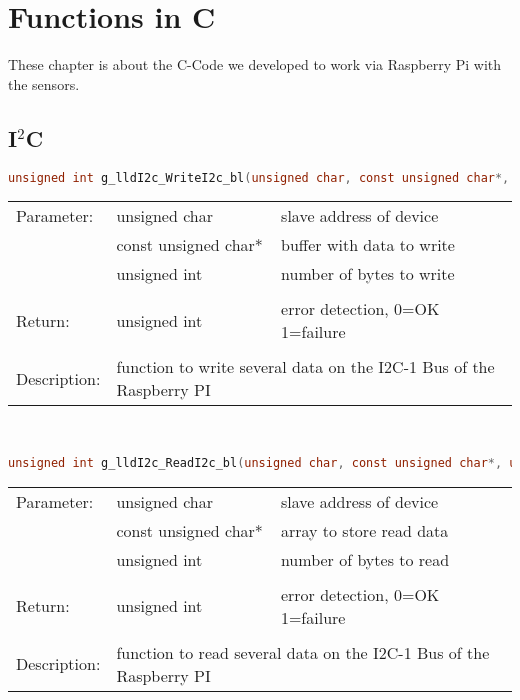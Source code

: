 
\chapter{Functions in C}
\label{ch:functions}

These chapter is about the C-Code we developed to work via Raspberry Pi with the sensors.


\section{I$^2$C}

\begin{lstlisting}[language=C, basicstyle=\small, caption=Write on I2C-1]
unsigned int g_lldI2c_WriteI2c_bl(unsigned char, const unsigned char*, unsigned int);
\end{lstlisting}


\begin{tabular}{lll}
Parameter: & unsigned char & slave address of device\\
					 & const unsigned char* & buffer with data to write\\
					 & unsigned int & number of bytes to write\\
					 &	\\
Return: & unsigned int & error detection, 0=OK 1=failure\\
							&&\\
Description: & \multicolumn{2}{l}{function to write several data on the I2C-1 Bus of the Raspberry PI}\\
\end{tabular}
\\


\begin{lstlisting}[language=C, basicstyle=\small, caption=Read from I2C-1]
unsigned int g_lldI2c_ReadI2c_bl(unsigned char, const unsigned char*, unsigned int);
\end{lstlisting}

\begin{tabular}{lll}
Parameter: & unsigned char & slave address of device\\
					 & const unsigned char* & array to store read data\\
					 & unsigned int & number of bytes to read\\
					 &	\\
Return: & unsigned int & error detection, 0=OK 1=failure\\
							&&\\
Description: & \multicolumn{2}{l}{function to read several data on the I2C-1 Bus of the Raspberry PI}\\
\end{tabular}
\\

